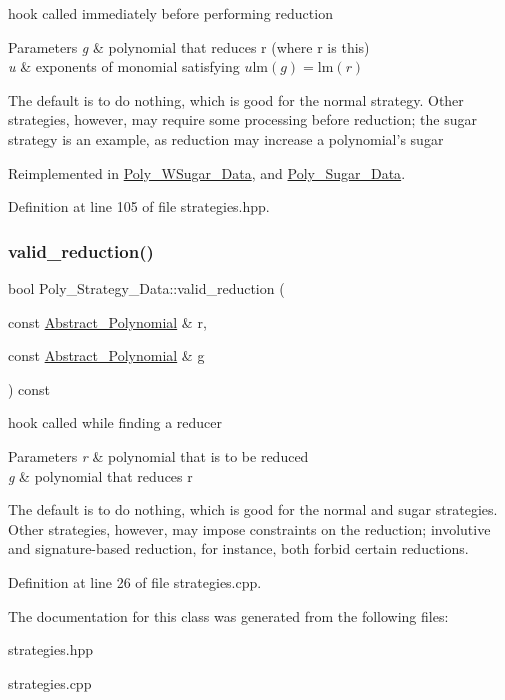 hook called immediately before performing reduction 


\begin{DoxyParams}{Parameters}
{\em g} & polynomial that reduces {\ttfamily r} (where {\ttfamily r} is {\ttfamily this}) \\
\hline
{\em u} & exponents of monomial satisfying $u\textrm{lm}(g)=\textrm{lm}(r)$\\
\hline
\end{DoxyParams}
The default is to do nothing, which is good for the normal strategy. Other strategies, however, may require some processing before reduction; the sugar strategy is an example, as reduction may increase a polynomial's sugar 

Reimplemented in \hyperlink{class_poly___w_sugar___data_a4a34039eb50a2294d2aaf6245c1833b8}{Poly\+\_\+\+W\+Sugar\+\_\+\+Data}, and \hyperlink{class_poly___sugar___data_a1b2e8a7fe4fcd57555fa58e48620b2bf}{Poly\+\_\+\+Sugar\+\_\+\+Data}.



Definition at line 105 of file strategies.\+hpp.

\mbox{\label{class_poly___strategy___data_a996754ff163b0ff32d783ec723ac35be}} 
\subsubsection{\texorpdfstring{valid\+\_\+reduction()}{valid\_reduction()}}
{\footnotesize\ttfamily bool Poly\+\_\+\+Strategy\+\_\+\+Data\+::valid\+\_\+reduction (\begin{DoxyParamCaption}\item[{const \hyperlink{class_abstract___polynomial}{Abstract\+\_\+\+Polynomial} \&}]{r,  }\item[{const \hyperlink{class_abstract___polynomial}{Abstract\+\_\+\+Polynomial} \&}]{g }\end{DoxyParamCaption}) const\hspace{0.3cm}{\ttfamily [virtual]}}



hook called while finding a reducer 


\begin{DoxyParams}{Parameters}
{\em r} & polynomial that is to be reduced \\
\hline
{\em g} & polynomial that reduces {\ttfamily r} \\
\hline
\end{DoxyParams}
The default is to do nothing, which is good for the normal and sugar strategies. Other strategies, however, may impose constraints on the reduction; involutive and signature-\/based reduction, for instance, both forbid certain reductions. 

Definition at line 26 of file strategies.\+cpp.



The documentation for this class was generated from the following files\+:\begin{DoxyCompactItemize}
\item 
strategies.\+hpp\item 
strategies.\+cpp\end{DoxyCompactItemize}
